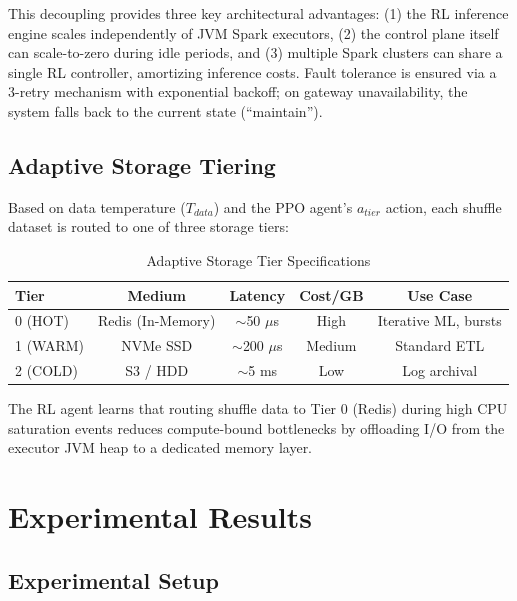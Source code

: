 \documentclass[10pt, conference, compsocconf]{IEEEtran}
\begin{document}
This decoupling provides three key architectural advantages: (1) the RL inference engine scales independently of JVM Spark executors, (2) the control plane itself can scale-to-zero during idle periods, and (3) multiple Spark clusters can share a single RL controller, amortizing inference costs. Fault tolerance is ensured via a 3-retry mechanism with exponential backoff; on gateway unavailability, the system falls back to the current state (``maintain'').

\subsection{Adaptive Storage Tiering}

Based on data temperature ($T_{data}$) and the PPO agent's $a_{tier}$ action, each shuffle dataset is routed to one of three storage tiers:

\begin{table}[ht]
\centering
\caption{Adaptive Storage Tier Specifications}
\label{tab:storage_tiers}
\renewcommand{\arraystretch}{1.2}
\begin{tabular}{lcccc}
\toprule
\textbf{Tier} & \textbf{Medium} & \textbf{Latency} & \textbf{Cost/GB} & \textbf{Use Case} \\
\midrule
0 (HOT)   & Redis (In-Memory) & $\sim$50 $\mu$s  & High   & Iterative ML, bursts \\
1 (WARM)  & NVMe SSD          & $\sim$200 $\mu$s & Medium & Standard ETL \\
2 (COLD)  & S3 / HDD          & $\sim$5 ms       & Low    & Log archival \\
\bottomrule
\end{tabular}
\end{table}

The RL agent learns that routing shuffle data to Tier 0 (Redis) during high CPU saturation events reduces compute-bound bottlenecks by offloading I/O from the executor JVM heap to a dedicated memory layer.

\section{Experimental Results}

\subsection{Experimental Setup}
\end{document}
